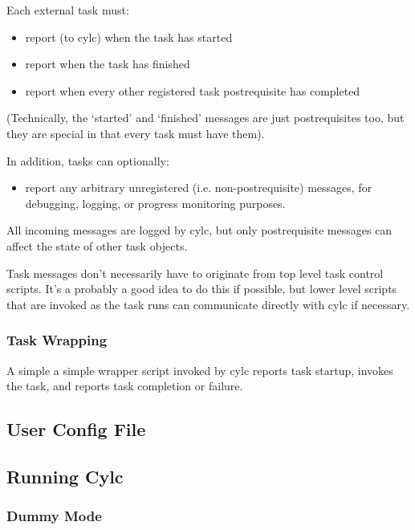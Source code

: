 \documentclass[11pt,a4paper]{article}
\begin{document}
Each external task must:

\begin{itemize}
\item report (to cylc) when the task has started
\item report when the task has finished
\item report when every other registered task postrequisite has
completed
\end{itemize}

(Technically, the `started' and `finished' messages are just
postrequisites too, but they are special in that every task
must have them).

In addition, tasks can optionally:

\begin{itemize}
\item report any arbitrary unregistered (i.e. non-postrequisite)
messages, for debugging, logging, or progress monitoring purposes.
\end{itemize}

All incoming messages are logged by cylc, but only postrequisite
messages can affect the state of other task objects.

Task messages don't necessarily have to originate from top level task
control scripts. It's a probably a good idea to do this if possible, but
lower level scripts that are invoked as the task runs can communicate
directly with cylc if necessary.

\subsubsection{Task Wrapping}

A simple a simple wrapper script invoked by cylc reports task
startup, invokes the task, and reports task completion or failure. 

\pagebreak
\subsection{User Config File}

{
\color{Magenta}

}



\subsection{Running Cylc}

\label{sec:dummymode}
\subsubsection{Dummy Mode}
\end{document}
